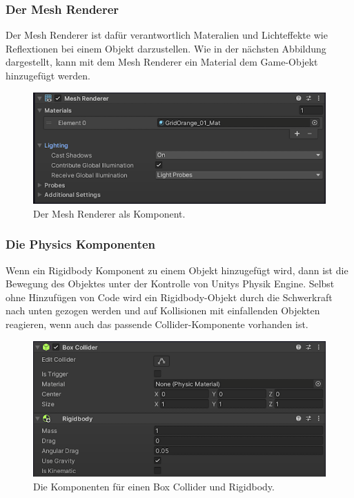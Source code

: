 \pagebreak

\subsubsection{Der Mesh Renderer}
Der Mesh Renderer ist dafür verantwortlich Materalien und Lichteffekte wie Reflextionen bei einem Objekt darzustellen. Wie in der nächsten Abbildung dargestellt, kann mit dem Mesh Renderer ein Material dem Game-Objekt hinzugefügt werden.\\
\noindent

\begin{figure}[H]
  \centering
  \includegraphics[width=0.7\linewidth]{chapters/14/Images/MeshRenderer.png}
  \caption{Der Mesh Renderer als Komponent.}
  \label{U03}
\end{figure}

\subsubsection{Die Physics Komponenten}
\glqq Wenn ein Rigidbody Komponent zu einem Objekt hinzugefügt wird, dann ist die Bewegung des Objektes unter der Kontrolle von Unitys Physik Engine. Selbst ohne Hinzufügen von Code wird ein Rigidbody-Objekt durch die Schwerkraft nach unten gezogen werden und auf Kollisionen mit einfallenden Objekten reagieren, wenn auch das passende Collider-Komponente vorhanden ist.\grqq \cite[][Rigidbody, Unity Documentation]{unitydocRigidbody} \\

\noindent

\begin{figure}[H]
  \centering
  \includegraphics[width=0.7\linewidth]{chapters/14/Images/Physics.png}
  \caption{Die Komponenten für einen Box Collider und Rigidbody.}
  \label{U04}
\end{figure}

